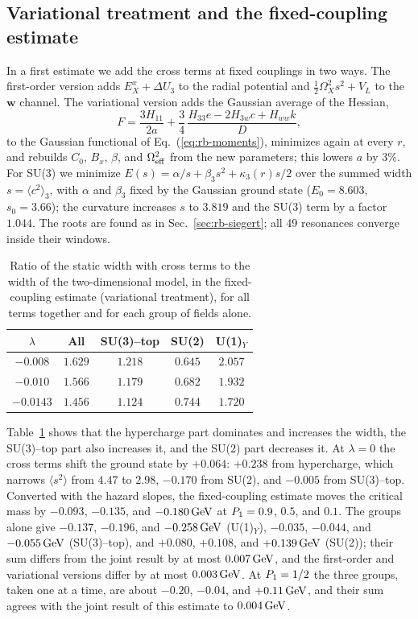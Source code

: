 \subsection{Variational treatment and the fixed-coupling estimate}
\label{sec:rb-var}

In a first estimate we add the cross terms at fixed couplings in two ways.
The first-order version adds $E_X^x+\Delta U_3$ to the radial potential and $\frac12\Omega_X^2s^2+V_L$ to the $\bm w$ channel.
The variational version adds the Gaussian average of the Hessian,
\begin{equation}
F=\frac{3H_{11}}{2a}+\frac34\,\frac{H_{33}e-2H_{3w}c+H_{ww}k}{D},
\label{eq:rb-F}
\end{equation}
to the Gaussian functional of Eq.~(\ref{eq:rb-moments}), minimizes again at every $r$, and rebuilds $C_0$, $B_x$, $\beta$, and $\Omega_{\rm eff}^2$ from the new parameters; this lowers $a$ by $3\%$.
For SU(3) we minimize $E(s)=\alpha/s+\beta_3s^2+\kappa_3(r)s/2$ over the summed width $s=\langle c^2\rangle_3$, with $\alpha$ and $\beta_3$ fixed by the Gaussian ground state ($E_0=8.603$, $s_0=3.66$); the curvature increases $s$ to $3.819$ and the SU(3) term by a factor $1.044$. %
The roots are found as in Sec.~\ref{sec:rb-siegert}; all 49 resonances converge inside their windows. %

\begin{table}[t]
\centering
\caption{Ratio of the static width with cross terms to the width of the two-dimensional model, in the fixed-coupling estimate (variational treatment), for all terms together and for each group of fields alone.} %
\label{tab:rb-ratios}
\begin{tabular}{ccccc}
\toprule
$\lambda$ & All & SU(3)--top & SU(2) & U(1)$_Y$ \\
\midrule
$-0.008$ & $1.629$ & $1.218$ & $0.645$ & $2.057$ \\ %
$-0.010$ & $1.566$ & $1.179$ & $0.682$ & $1.932$ \\ %
$-0.0143$ & $1.456$ & $1.124$ & $0.744$ & $1.720$ \\ %
\bottomrule
\end{tabular}
\end{table}

Table~\ref{tab:rb-ratios} shows that the hypercharge part dominates and increases the width, the SU(3)--top part also increases it, and the SU(2) part decreases it.
At $\lambda=0$ the cross terms shift the ground state by $+0.064$: $+0.238$ from hypercharge, which narrows $\langle s^2\rangle$ from $4.47$ to $2.98$, $-0.170$ from SU(2), and $-0.005$ from SU(3)--top. %
Converted with the hazard slopes, the fixed-coupling estimate moves the critical mass by $-0.093$, $-0.135$, and $-0.180\,\mathrm{GeV}$ at $P_1=0.9$, $0.5$, and $0.1$. %
The groups alone give $-0.137$, $-0.196$, and $-0.258\,\mathrm{GeV}$ (U(1)$_Y$), $-0.035$, $-0.044$, and $-0.055\,\mathrm{GeV}$ (SU(3)--top), and $+0.080$, $+0.108$, and $+0.139\,\mathrm{GeV}$ (SU(2)); their sum differs from the joint result by at most $0.007\,\mathrm{GeV}$, and the first-order and variational versions differ by at most $0.003\,\mathrm{GeV}$. %
At $P_1=1/2$ the three groups, taken one at a time, are about $-0.20$, $-0.04$, and $+0.11\,\mathrm{GeV}$, and their sum agrees with the joint result of this estimate to $0.004\,\mathrm{GeV}$. %

